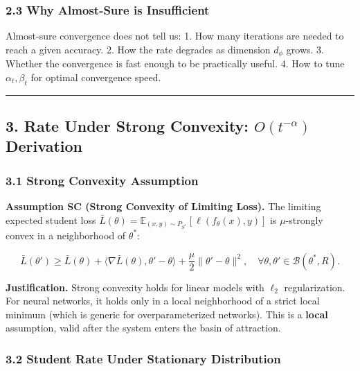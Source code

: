 \documentclass[
  12pt,
]{ctexart}
\begin{document}
\subsubsection{2.3 Why Almost-Sure is
Insufficient}\label{why-almost-sure-is-insufficient}

Almost-sure convergence does not tell us: 1. How many iterations are
needed to reach a given accuracy. 2. How the rate degrades as dimension
\(d_\phi\) grows. 3. Whether the convergence is fast enough to be
practically useful. 4. How to tune \(\alpha_t, \beta_t\) for optimal
convergence speed.

\begin{center}\rule{0.5\linewidth}{0.5pt}\end{center}

\subsection{\texorpdfstring{3. Rate Under Strong Convexity:
\(O(t^{-\alpha})\)
Derivation}{3. Rate Under Strong Convexity: O(t\^{}\{-\textbackslash alpha\}) Derivation}}\label{rate-under-strong-convexity-ot-alpha-derivation}

\subsubsection{3.1 Strong Convexity
Assumption}\label{strong-convexity-assumption}

\textbf{Assumption SC (Strong Convexity of Limiting Loss).} The limiting
expected student loss
\(\bar{L}(\theta) = \mathbb{E}_{(x,y) \sim P_{S^*}}[\ell(f_\theta(x), y)]\)
is \(\mu\)-strongly convex in a neighborhood of \(\theta^*\):

\[\bar{L}(\theta') \geq \bar{L}(\theta) + \langle \nabla \bar{L}(\theta), \theta' - \theta \rangle + \frac{\mu}{2} \|\theta' - \theta\|^2, \quad \forall \theta, \theta' \in \mathcal{B}(\theta^*, R).\]

\textbf{Justification.} Strong convexity holds for linear models with
\(\ell_2\) regularization. For neural networks, it holds only in a local
neighborhood of a strict local minimum (which is generic for
overparameterized networks). This is a \textbf{local} assumption, valid
after the system enters the basin of attraction.

\subsubsection{3.2 Student Rate Under Stationary
Distribution}\label{student-rate-under-stationary-distribution}
\end{document}
